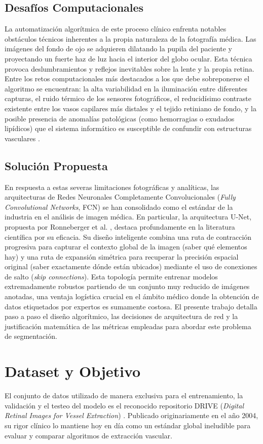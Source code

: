 \documentclass[conference]{IEEEtran}
\begin{document}
\subsection{Desafíos Computacionales}
La automatización algorítmica de este proceso clínico enfrenta notables obstáculos técnicos inherentes a la propia naturaleza de la fotografía médica. Las imágenes del fondo de ojo se adquieren dilatando la pupila del paciente y proyectando un fuerte haz de luz hacia el interior del globo ocular. Esta técnica provoca deslumbramientos y reflejos inevitables sobre la lente y la propia retina. Entre los retos computacionales más destacados a los que debe sobreponerse el algoritmo se encuentran: la alta variabilidad en la iluminación entre diferentes capturas, el ruido térmico de los sensores fotográficos, el reducidísimo contraste existente entre los vasos capilares más distales y el tejido retiniano de fondo, y la posible presencia de anomalías patológicas (como hemorragias o exudados lipídicos) que el sistema informático es susceptible de confundir con estructuras vasculares \cite{ref4}.

\subsection{Solución Propuesta}
En respuesta a estas severas limitaciones fotográficas y analíticas, las arquitecturas de Redes Neuronales Completamente Convolucionales (\textit{Fully Convolutional Networks}, FCN) se han consolidado como el estándar de la industria en el análisis de imagen médica. En particular, la arquitectura U-Net, propuesta por Ronneberger et al. \cite{ref3}, destaca profundamente en la literatura científica por su eficacia. Su diseño inteligente combina una ruta de contracción progresiva para capturar el contexto global de la imagen (saber qué elementos hay) y una ruta de expansión simétrica para recuperar la precisión espacial original (saber exactamente dónde están ubicados) mediante el uso de conexiones de salto (\textit{skip connections}). Esta topología permite entrenar modelos extremadamente robustos partiendo de un conjunto muy reducido de imágenes anotadas, una ventaja logística crucial en el ámbito médico donde la obtención de datos etiquetados por expertos es sumamente costosa. El presente trabajo detalla paso a paso el diseño algorítmico, las decisiones de arquitectura de red y la justificación matemática de las métricas empleadas para abordar este problema de segmentación.

\section{Dataset y Objetivo}
El conjunto de datos utilizado de manera exclusiva para el entrenamiento, la validación y el testeo del modelo es el reconocido repositorio DRIVE (\textit{Digital Retinal Images for Vessel Extraction}) \cite{ref7}. Publicado originariamente en el año 2004, su rigor clínico lo mantiene hoy en día como un estándar global ineludible para evaluar y comparar algoritmos de extracción vascular.
\end{document}
